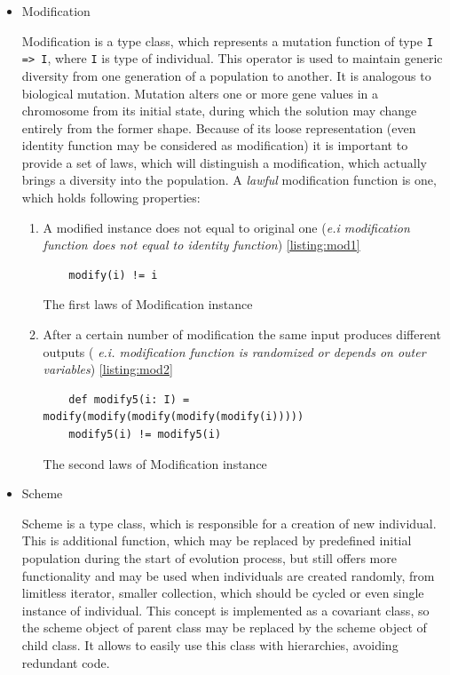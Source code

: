 \begin{itemize}
\begin{itemize}
\item
Modification

Modification is a type class, which represents a mutation function of type \texttt{I => I}, where \texttt{I} is type of individual. This operator is used to maintain generic diversity from one generation of a population to another. It is analogous to biological mutation. Mutation alters one or more gene values in a chromosome from its initial state, during which the solution may change entirely from the former shape. Because of its loose representation (even identity function may be considered as modification) it is important to provide a set of laws, which will distinguish a modification, which actually brings a diversity into the population. A \textit{lawful} modification function is one, which holds following properties:

\begin{enumerate}
\item
A modified instance does not equal to original one (\textit{e.i modification function does not equal to identity function}) \ref{listing:mod1}

\begin{listing}
\begin{verbatim}
	modify(i) != i
\end{verbatim}
\caption{The first laws of Modification instance} \label{listing:mod1}
\end{listing}

\item
After a certain number of modification the same input produces different outputs (\textit{ e.i. modification function is randomized or depends on outer variables}) \ref{listing:mod2}

\begin{listing}
\begin{verbatim}
	def modify5(i: I) = modify(modify(modify(modify(modify(i)))))
	modify5(i) != modify5(i)
\end{verbatim}
\caption{The second laws of Modification instance} \label{listing:mod2}
\end{listing}


\end{enumerate}
\medbreak

\item
Scheme

Scheme is a type class, which is responsible for a creation of new individual. This is additional function, which may be replaced by predefined initial population during the start of evolution process, but still offers more functionality and may be used when individuals are created randomly, from limitless iterator, smaller collection, which should be cycled or even single instance of individual. This concept is implemented as a covariant class, so the scheme object of parent class may be replaced by the scheme object of child class. It allows to easily use this class with hierarchies, avoiding redundant code. 
\end{itemize} 


\end{itemize}
